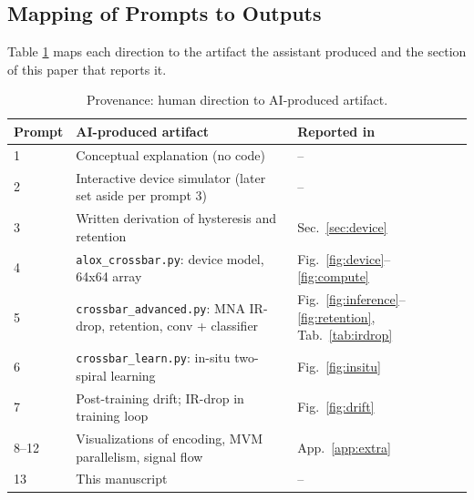 \subsection{Mapping of Prompts to Outputs}
Table \ref{tab:provenance} maps each direction to the artifact the assistant
produced and the section of this paper that reports it.

\begin{table}[h]
\caption{Provenance: human direction to AI-produced artifact.}
\label{tab:provenance}
\centering
\small
\begin{tabular}{p{0.6cm}p{4.2cm}p{2.0cm}}
\toprule
Prompt & AI-produced artifact & Reported in \\
\midrule
1 & Conceptual explanation (no code) & -- \\
2 & Interactive device simulator (later set aside per prompt 3) & -- \\
3 & Written derivation of hysteresis and retention & Sec.~\ref{sec:device} \\
4 & \texttt{alox\_crossbar.py}: device model, 64x64 array & Fig.~\ref{fig:device}--\ref{fig:compute} \\
5 & \texttt{crossbar\_advanced.py}: MNA IR-drop, retention, conv + classifier & Fig.~\ref{fig:inference}--\ref{fig:retention}, Tab.~\ref{tab:irdrop} \\
6 & \texttt{crossbar\_learn.py}: in-situ two-spiral learning & Fig.~\ref{fig:insitu} \\
7 & Post-training drift; IR-drop in training loop & Fig.~\ref{fig:drift} \\
8--12 & Visualizations of encoding, MVM parallelism, signal flow & App.~\ref{app:extra} \\
13 & This manuscript & -- \\
\bottomrule
\end{tabular}
\end{table}

